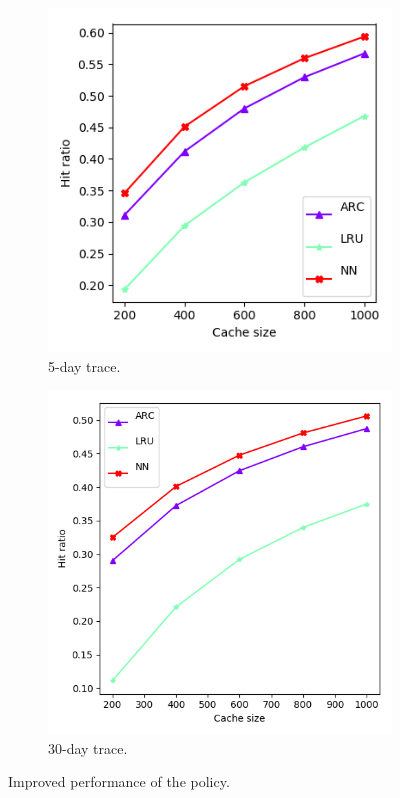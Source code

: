 \begin{figure}[h!]
	\centering
	\begin{subfigure}[b]{0.49\linewidth}
		\includegraphics[width=\linewidth]{pics/cache4.png}
		\caption{5-day trace.}
	\end{subfigure}
	\begin{subfigure}[b]{0.49\linewidth}
		\includegraphics[width=\linewidth]{pics/cache4_2.png}
		\caption{30-day trace.}
	\end{subfigure}
	\caption{Improved performance of the policy.}
	\label{fig:cache4}
\end{figure}

